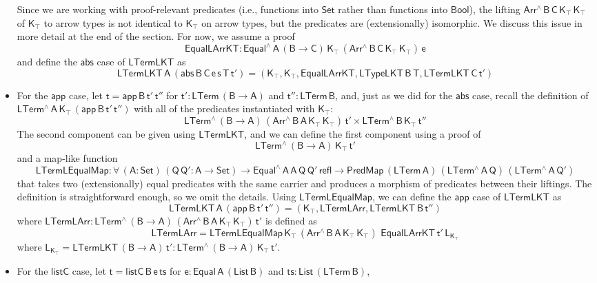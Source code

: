\documentclass[9pt]{entcs}
\begin{document}
\begin{itemize}
\[\]
Since we are working with proof-relevant predicates
(i.e., functions into $\mathsf{Set}$ rather than functions into $\mathsf{Bool}$), 
the lifting $\mathsf{Arr^{\wedge} \, B\, C\, K_\top \, K_\top}$ of $\mathsf{K_\top}$ to arrow types
is not identical to $\mathsf{K_\top}$ on arrow types, but the predicates are (extensionally) isomorphic. 
We discuss this issue in more detail at the end of the section. 
For now, we assume a proof 
\[
  \mathsf{EqualLArrKT : Equal^{\wedge} \, A\, (B \to C)\, K_\top\, (Arr^{\wedge} \, B\, C\, K_\top \, K_\top)\, e}
\]
and define the $\mathsf{abs}$ case of $\mathsf{LTermLKT}$ as 
\[
  \mathsf{LTermLKT\,A\, (abs\, B \,C \, e \,s \,T \, t') = 
    (K_\top , K_\top , EqualLArrKT , LTypeLKT\, B\, T , LTermLKT\, C\, t')
  }
\]
\item For the $\mathsf{app}$ case, let $\mathsf{t = app\, B\, t' \, t''}$
for $\mathsf{t' : LTerm\,(B \to A)}$ and $\mathsf{t'' : LTerm\,B}$,
and, just as we did for the $\mathsf{abs}$ case, 
recall the definition of $\mathsf{LTerm^{\wedge}\, A\, K_\top\, (app\, B\, t'\, t'')}$
with all of the predicates instantiated with $\mathsf{K_\top}$: 
\[
\mathsf{
      LTerm^{\wedge}\, (B \to A)\, (Arr^{\wedge} \, B\, A\, K_\top \, K_\top)\, t'
      \times LTerm^{\wedge}\, B\, K_\top\, t''}
\]
The second component can be given using $\mathsf{LTermLKT}$, and we can 
define the first component using a proof of
\[
\mathsf{LTerm^{\wedge}\, (B \to A)\, K_\top\, t'}
\]
and a map-like function 
\[
  \mathsf{LTermLEqualMap : \forall\, (A : Set)\, (Q\,Q' : A \to Set) 
    \to Equal^{\wedge}\,A\,A\,Q\,Q'\,refl
    \to PredMap\,(LTerm\,A)\, (LTerm^{\wedge}\,A\,Q)\,(LTerm^{\wedge}\,A\,Q')}
\]
that takes two (extensionally) equal predicates with the same carrier 
and produces a morphism of predicates between their liftings. The definition is 
straightforward enough, so we omit the details. 
Using $\mathsf{LTermLEqualMap}$, we can define the $\mathsf{app}$ case of $\mathsf{LTermLKT}$ as 
\[
  \mathsf{LTermLKT\,A\, (app\, B\, t'\, t'') = 
    (K_\top , LTermLArr , LTermLKT\,B\,t'')}
\]
where $\mathsf{ LTermLArr : LTerm^{\wedge}\, (B \to A)\, (Arr^{\wedge} \, B\, A\, K_\top \, K_\top)\, t'}$ is defined as
\[
  \mathsf{LTermLArr =  LTermLEqualMap\,K_\top\,(Arr^{\wedge}\,B\,A\,K_\top\,K_\top)\,\, EqualLArrKT\, t'\, L_{K_\top}}
\]
where $\mathsf{L_{K_\top} = LTermLKT\, (B \to A)\, t' : LTerm^{\wedge}\, (B \to A) \, K_\top\, t'}$.
\item For the $\mathsf{listC}$ case, let $\mathsf{t = listC\, B\, e\, ts}$
for $\mathsf{e : Equal\,A\,(List\,B)}$ and $\mathsf{ts : List\,(LTerm\, B)}$,

\end{itemize}
\end{document}
